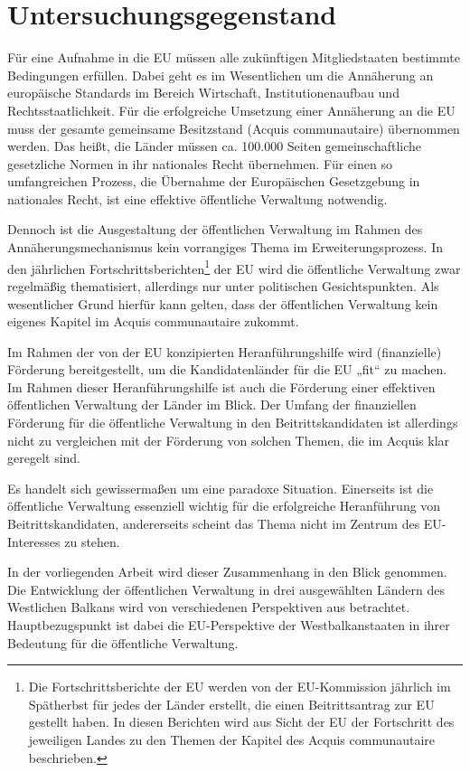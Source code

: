 \section{Untersuchungsgegenstand}
Für eine Aufnahme in die EU müssen alle zukünftigen Mitgliedstaaten bestimmte Bedingungen erfüllen. Dabei geht es im Wesentlichen um die Annäherung an europäische Standards im Bereich Wirtschaft, Institutionenaufbau und Rechtsstaatlichkeit. Für die erfolgreiche Umsetzung einer Annäherung an die EU muss der gesamte gemeinsame Besitzstand (Acquis communautaire) übernommen werden. Das heißt, die Länder müssen ca. 100.000 Seiten gemeinschaftliche gesetzliche Normen in ihr nationales Recht übernehmen.
Für einen so umfangreichen Prozess, die Übernahme der Europäischen Gesetzgebung in nationales Recht, ist eine effektive öffentliche Verwaltung notwendig.\par
Dennoch ist die Ausgestaltung der öffentlichen Verwaltung im Rahmen des Annäherungsmechanismus kein vorrangiges Thema im Erweiterungsprozess. In den jährlichen Fortschrittsberichten\footnote{Die Fortschrittsberichte der EU werden von der EU-Kommission jährlich im Spätherbst für jedes der Länder erstellt, die einen Beitrittsantrag zur EU gestellt haben. In diesen Berichten wird aus Sicht der EU der Fortschritt des jeweiligen Landes zu den Themen der Kapitel des Acquis communautaire beschrieben.} der EU wird die öffentliche Verwaltung zwar regelmäßig thematisiert, allerdings nur unter politischen Gesichtspunkten. Als wesentlicher Grund hierfür kann gelten, dass der öffentlichen Verwaltung kein eigenes Kapitel im Acquis communautaire zukommt.\par
Im Rahmen der von der EU konzipierten Heranführungshilfe wird (finanzielle) Förderung bereitgestellt, um die Kandidatenländer für die EU „fit“ zu machen. Im Rahmen dieser Heranführungshilfe ist auch die Förderung einer effektiven öffentlichen Verwaltung der Länder im Blick. Der Umfang der finanziellen Förderung für die öffentliche Verwaltung in den Beitrittskandidaten ist allerdings nicht zu vergleichen mit der Förderung von solchen Themen, die im Acquis klar geregelt sind.\par
Es handelt sich gewissermaßen um eine paradoxe Situation. Einerseits ist die öffentliche Verwaltung essenziell wichtig für die erfolgreiche Heranführung von Beitrittskandidaten, andererseits scheint das Thema nicht im Zentrum des EU-Interesses zu stehen.\par
In der vorliegenden Arbeit wird dieser Zusammenhang in den Blick genommen. Die Entwicklung der öffentlichen Verwaltung in drei ausgewählten Ländern des Westlichen Balkans wird von verschiedenen Perspektiven aus betrachtet. Hauptbezugspunkt ist dabei die EU-Perspektive der Westbalkanstaaten in ihrer Bedeutung für die öffentliche Verwaltung.\par
